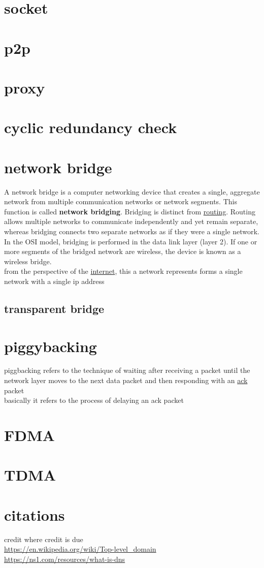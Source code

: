 \documentclass[a4paper,12pt]{article}
\begin{document}
\section{socket}
\label{sec:orgc3ed321}
\section{p2p}
\label{sec:org87bd447}
\section{proxy}
\label{sec:org00e635d}
\section{cyclic redundancy check}
\label{sec:orgeda63d2}
\section{network bridge}
\label{sec:org305b0fc}
A network bridge is a computer networking device that creates a single, aggregate network from multiple communication networks or network segments. This function is called \textbf{network bridging}. Bridging is distinct from \hyperref[sec:org037b655]{routing}. Routing allows multiple networks to communicate independently and yet remain separate, whereas bridging connects two separate networks as if they were a single network. In the OSI model, bridging is performed in the data link layer (layer 2). If one or more segments of the bridged network are wireless, the device is known as a wireless bridge.\\
from the perspective of the \hyperref[sec:orga773caf]{internet}, this a network represents forms a single network with a single ip address\\
\subsection{transparent bridge}
\label{sec:org374a9f5}
\section{piggybacking}
\label{sec:org798967a}
piggbacking refers to the technique of waiting after receiving a packet until the network layer moves to the next data packet and then responding with an \hyperref[sec:org152b6fe]{ack} packet\\
basically it refers to the process of delaying an ack packet\\
\section{FDMA}
\label{sec:orgc914c96}
\section{TDMA}
\label{sec:org456a4d9}
\section{citations}
\label{sec:org8a7b0c3}
credit where credit is due\\
\url{https://en.wikipedia.org/wiki/Top-level\_domain}\\
\url{https://ns1.com/resources/what-is-dns}\\
\end{document}
